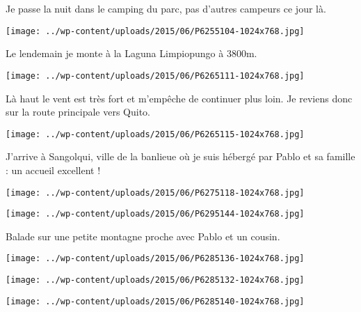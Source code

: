 Je passe la nuit dans le camping du parc, pas d'autres campeurs ce jour là. 
\begin{center} 
\texttt{[image: ../wp-content/uploads/2015/06/P6255104-1024x768.jpg]} 
\end{center}

Le lendemain je monte à la Laguna Limpiopungo à 3800m. \\
\begin{center} 
\texttt{[image: ../wp-content/uploads/2015/06/P6265111-1024x768.jpg]} 
\end{center}
\vspace{-\topsep}
\pagebreak

Là haut le vent est très fort et m'empêche de continuer plus loin. Je reviens donc sur la route principale vers Quito. 
\begin{center}
\texttt{[image: ../wp-content/uploads/2015/06/P6265115-1024x768.jpg]} 
\end{center}

J'arrive à Sangolqui, ville de la banlieue où je suis hébergé par Pablo et sa famille : un accueil excellent ! 
\begin{center} 
\texttt{[image: ../wp-content/uploads/2015/06/P6275118-1024x768.jpg]} 
\end{center}
\begin{center}
\texttt{[image: ../wp-content/uploads/2015/06/P6295144-1024x768.jpg]} 
\end{center}

Balade sur une petite montagne proche avec Pablo et un cousin. 
\begin{center} 
\texttt{[image: ../wp-content/uploads/2015/06/P6285136-1024x768.jpg]} 
\end{center}
\begin{center} 
\texttt{[image: ../wp-content/uploads/2015/06/P6285132-1024x768.jpg]} 
\end{center}
\vfill
\begin{center} 
\texttt{[image: ../wp-content/uploads/2015/06/P6285140-1024x768.jpg]} 
\end{center}
\vspace{-\topsep}
\vspace{-0.75mm}
\pagebreak

